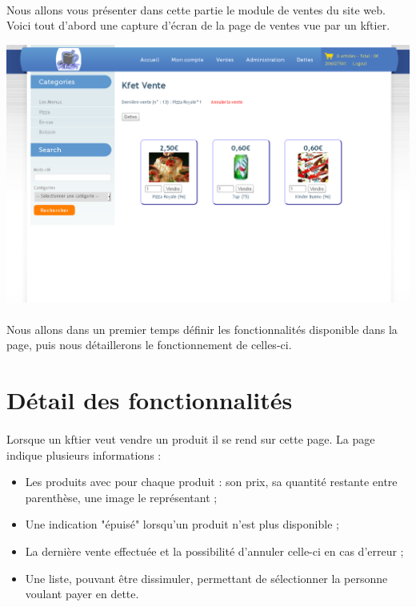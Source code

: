 \documentclass[twoside,UTF8]{EPURapport}
\begin{document}
    \paragraph{}Nous allons vous présenter dans cette partie le module de ventes du site web. Voici tout d'abord une capture d'écran de la page de ventes vue par un kftier.
    \begin{center}
        \includegraphics[width=1\linewidth]{logos/ventes.png}
    \end{center}
    \paragraph{}Nous allons dans un premier temps définir les fonctionnalités disponible dans la page, puis nous détaillerons le fonctionnement de celles-ci.

    \section{Détail des fonctionnalités}

        \paragraph{}Lorsque un kftier veut vendre un produit il se rend sur cette page. La page indique plusieurs informations : \\
            \begin{itemize}
                \item Les produits avec pour chaque produit : son prix, sa quantité restante entre parenthèse, une image le représentant ;\\
                \item Une indication "épuisé" lorsqu'un produit n'est plus disponible ;\\
                \item La dernière vente effectuée et la possibilité d'annuler celle-ci en cas d'erreur ;\\
                \item Une liste, pouvant être dissimuler, permettant de sélectionner la personne voulant payer en dette.\\
            \end{itemize}
\end{document}

